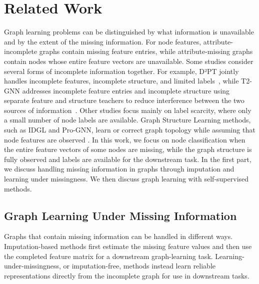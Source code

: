 \section{Related Work}
\label{sec:related}
Graph learning problems can be distinguished by what information is unavailable and by the extent of the missing information. 
For node features, attribute-incomplete graphs contain missing feature entries, while attribute-missing graphs contain nodes whose entire feature vectors are unavailable. 
Some studies consider several forms of incomplete information together. For example, D²PT jointly handles incomplete features, incomplete structure, and limited labels~\cite{liu2023learning}, while T2-GNN addresses incomplete feature entries and incomplete structure using separate feature and structure teachers to reduce interference between the two sources of information~\cite{huo2023t2}.
Other studies focus mainly on label scarcity, where only a small number of node labels are available. 
Graph Structure Learning methods, such as IDGL and Pro-GNN, learn or correct graph topology while assuming that node features are observed \cite{chen2020iterative,jin2020graph}. 
In this work, we focus on node classification when the entire feature vectors of some nodes are missing, while the graph structure is fully observed and labels are available for the downstream task.
In the first part, we discuss handling missing information in graphs through imputation and learning under missingness. We then discuss graph learning with self-supervised methods.


\subsection{Graph Learning Under Missing Information}
Graphs that contain missing information can be handled in different ways. Imputation-based methods first estimate the missing feature values and then use the completed feature matrix for a downstream graph-learning task.
Learning-under-missingness, or imputation-free, methods instead learn reliable representations directly from the incomplete graph for use in downstream tasks.

